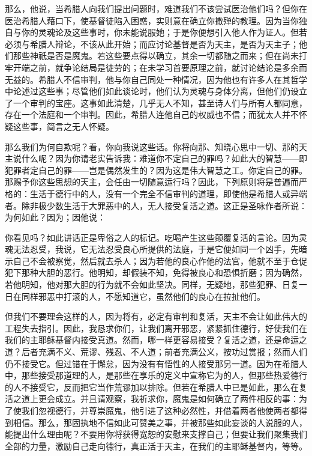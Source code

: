 那么，他说，当希腊人向我们提出问题时，难道我们不该尝试医治他们吗？但你在医治希腊人藉口下，使基督徒陷入困惑，实则意在确立你撒殚的教理。因为当你独自与你的灵魂论及这些事时，你未能说服她；于是你便想引入他人作为证人。但若必须与希腊人辩论，不该从此开始；而应讨论基督是否为天主，是否为天主子；他们那些神祇是否是魔鬼。若这些要点得以确立，其余一切都随之而来；但在尚未打牢开端之前，就争论结局是徒劳的；在未学习首要原理之前，就讨论结论是多余而无益的。希腊人不信审判，他与你自己同处一种情况，因为他也有许多人在其哲学中论述过这些事；尽管他们如此谈论时，他们认为灵魂与身体分离，但他们仍设立了一个审判的宝座。这事如此清楚，几乎无人不知，甚至诗人们与所有人都同意，存在一个法庭和一个审判。因此，希腊人连他自己的权威也不信；而犹太人并不怀疑这些事，简言之无人怀疑。\par

那么我们为何自欺呢？看，你向我说这些话。你将向那、知晓心思中一切、那的天主说什么呢？因为你请老实告诉我：难道你不定自己的罪吗？如此大的智慧——即犯罪者定自己的罪——岂是偶然发生的？因为这是伟大智慧之工。你定自己的罪。那赐予你这些思想的天主，会任由一切随意运行吗？因此，下列原则将是普遍而严格的：生活于德行中的人，没有一个完全不信审判的道理，即使他是希腊人或异端者。除非极少数生活于大罪恶中的人，无人接受复活之道。这正是圣咏作者所说：为何如此？因为；因他说：\par

你看见吗？如此讲话正是卑俗之人的标记。吃喝产生这些颠覆复活的言论。因为灵魂无法忍受，我说，它无法忍受良心所提供的法庭，于是它便如同一个凶手，先暗示自己不会被察觉，然后就去杀人；因为若他的良心作他的法官，他就不至于仓促犯下那种大胆的恶行。他明知，却假装不知，免得被良心和恐惧折磨；因为确然，若他明知，他对那大胆的行为就不会如此坚决。同样，无疑地，那些犯罪、日复一日在同样邪恶中打滚的人，不愿知道它，虽然他们的良心在拉扯他们。\par

但我们不要理会这样的人，因为将有，必定有审判和复活，天主不会让如此伟大的工程失去指引。因此，我恳求你们，让我们离开邪恶，紧紧抓住德行，好使我们在我们的主耶稣基督内接受真道。然而，哪一样更容易接受？复活之道，还是命运之道？后者充满不义、荒谬、残忍、不人道；前者充满公义，按功过赏报；然而人们仍不接受它。但过错在于懈怠，因为没有有悟性的人接受那另一道。因为在希腊人中，那些接受那道理的人，是那些在享乐的定义中宣称它为的人，但那些热爱德行的人不接受它，反而把它当作荒谬加以排除。但若在希腊人中已是如此，那么在复活之道上更会成立。并且请观察，我祈求你，魔鬼是如何确立了两件相反的事：为了使我们忽视德行，并尊崇魔鬼，他引进了这种必然性，并借着两者他使两者都得到相信。那么，那固执地不信如此可赞美之事，并被那些如此妄谈的人说服的人，能提出什么理由呢？不要用你将获得宽恕的安慰来支撑自己；但要让我们聚集我们全部的力量，激励自己走向德行，真正活于天主，在我们的主耶稣基督内，等等。\par

